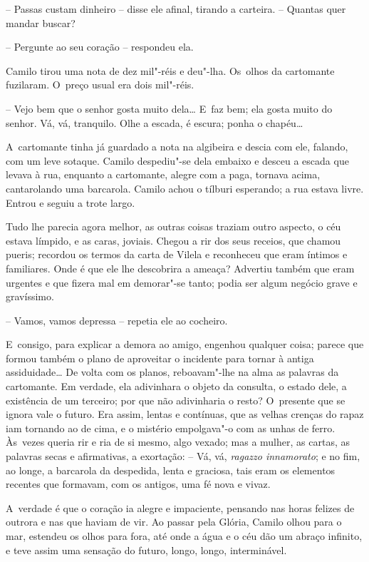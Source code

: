 -- Passas custam dinheiro -- disse ele afinal, tirando a carteira. --
Quantas quer mandar buscar?

-- Pergunte ao seu coração -- respondeu ela.

Camilo tirou uma nota de dez mil"-réis e deu"-lha. Os~olhos da cartomante
fuzilaram. O~preço usual era dois mil"-réis.

-- Vejo bem que o senhor gosta muito dela\ldots{} E~faz bem; ela gosta muito
do senhor. Vá, vá, tranquilo. Olhe a escada, é escura; ponha o chapéu\ldots{}

A~cartomante tinha já guardado a nota na algibeira e descia com ele,
falando, com um leve sotaque. Camilo despediu"-se dela embaixo e desceu a
escada que levava à rua, enquanto a cartomante, alegre com a paga,
tornava acima, cantarolando uma barcarola. Camilo achou o tílburi
esperando; a rua estava livre. Entrou e seguiu a trote largo.

Tudo lhe parecia agora melhor, as outras coisas traziam outro aspecto, o
céu estava límpido, e as caras, joviais. Chegou a rir dos seus receios,
que chamou pueris; recordou os termos da carta de Vilela e reconheceu
que eram íntimos e familiares. Onde é que ele lhe descobrira a ameaça?
Advertiu também que eram urgentes e que fizera mal em demorar"-se tanto;
podia ser algum negócio grave e gravíssimo.

-- Vamos, vamos depressa -- repetia ele ao cocheiro.

E~consigo, para explicar a demora ao amigo, engenhou qualquer coisa;
parece que formou também o plano de aproveitar o incidente para tornar à
antiga assiduidade\ldots{} De volta com os planos, reboavam"-lhe na alma as
palavras da cartomante. Em verdade, ela adivinhara o objeto da consulta,
o estado dele, a existência de um terceiro; por que não adivinharia o
resto? O~presente que se ignora vale o futuro. Era assim, lentas e
contínuas, que as velhas crenças do rapaz iam tornando ao de cima, e o
mistério empolgava"-o com as unhas de ferro. Às~vezes queria rir e ria de
si mesmo, algo vexado; mas a mulher, as cartas, as palavras secas e
afirmativas, a exortação: -- Vá, vá, \emph{ragazzo innamorato}; e no
fim, ao longe, a barcarola da despedida, lenta e graciosa, tais eram os
elementos recentes que formavam, com os antigos, uma fé nova e vivaz.

A~verdade é que o coração ia alegre e impaciente, pensando nas horas
felizes de outrora e nas que haviam de vir. Ao passar pela Glória,
Camilo olhou para o mar, estendeu os olhos para fora, até onde a água e
o céu dão um abraço infinito, e teve assim uma sensação do futuro,
longo, longo, interminável.

